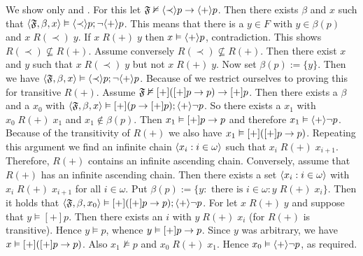 We show only  and .
 For this let $\mathfrak{F} \nvDash \langle\prec\rangle p \rightarrow \langle+\rangle p$. Then 
there exists $\beta$ and $x$ such that
$\langle \mathfrak{F}, \beta, x\rangle \vDash \langle \prec\rangle p; \neg \langle+\rangle p$.
This means that there is a $y \in F$ with $y \in \beta(p)$
and $x\; R(\prec)\; y$. If $x \; R(+)\; y$ then $x \vDash \langle+\rangle p$, 
contradiction. This shows $R(\prec) \nsubseteq R(+)$. Assume conversely
$R(\prec) \nsubseteq R(+)$.  Then there exist $x$ and $y$ such
that $x\; R(\prec)\; y$ but not $x\; R(+)\; y$. Now set
$\beta(p) := \{y\}$. Then we have $\langle \mathfrak{F}, \beta, x\rangle \vDash
\langle \prec\rangle p; \neg\langle+\rangle p$. 
 Because of  we restrict ourselves to 
proving this for transitive $R(+)$. Assume $\mathfrak{F} \nvDash 
[+]([+]p \rightarrow p) \rightarrow [+]p$. Then there exists a $\beta$ and 
a $x_0$ with $\langle \mathfrak{F}, \beta, x\rangle \vDash
[+](p \rightarrow [+]p); \langle +\rangle \neg p$. So there exists a
$x_1$ with $x_0\; R(+)\; x_1$ and $x_1 \not\in \beta(p)$.
Then $x_1 \vDash [+]p \rightarrow p$ and therefore $x_1 \vDash %
\auf +\zu \nicht p$. Because of the transitivity of $R(+)$
we also have $x_1 \vDash [+]([+]p \rightarrow p)$. Repeating this argument 
we find an infinite chain $\langle x_i : i \in \omega\rangle$ such that
$x_i\; R(+)\; x_{i+1}$. Therefore, $R(+)$ contains an infinite 
ascending chain. Conversely, assume that $R(+)$ has an infinite 
ascending chain. Then there exists a set $\langle x_i : i \in \omega\rangle$
with $x_i\; R(+)\; x_{i+1}$ for all $i \in \omega$. Put $\beta(p) :=
\{y : \mbox{ there is } i \in \omega: y \; R(+)\; x_i\}$.
Then it holds that $\langle \mathfrak{F}, \beta, x_0\rangle
\vDash [+]([+]p \rightarrow p); \langle+\rangle \neg p$.
For let $x\; R(+)\; y$ and suppose that $y \vDash [+]p$. 
Then there exists an $i$ with $y \; R(+)\; x_i$ (for $R(+)$ 
is transitive). Hence $y \vDash p$, whence $y \vDash [+]p \rightarrow p$. 
Since $y$ was arbitrary, we have $x \vDash [+]([+]p \rightarrow p)$. 
Also $x_1 \nvDash p$ and $x_0 \; R(+)\; x_1$. Hence
$x_0 \vDash \langle+\rangle \neg p$, as required. 
\proofend

